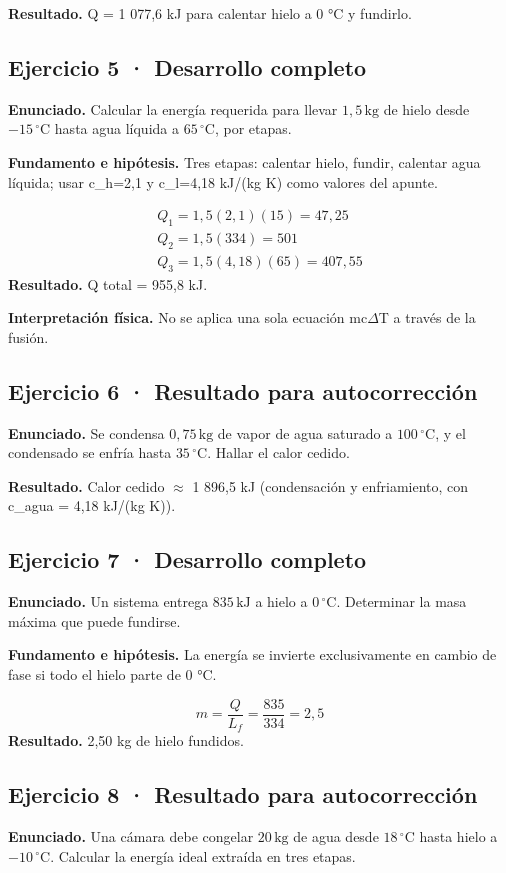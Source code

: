 \documentclass[11pt,a4paper]{article}
\begin{document}
\textbf{Resultado.} Q = 1 077,6 kJ para calentar hielo a 0 °C y fundirlo.


\subsection*{Ejercicio 5 · Desarrollo completo}
\textbf{Enunciado.} Calcular la energía requerida para llevar \(1{,}5\,\mathrm{kg}\) de hielo desde \(-15\,^\circ\mathrm C\) hasta agua líquida a \(65\,^\circ\mathrm C\), por etapas.

\textbf{Fundamento e hipótesis.} Tres etapas: calentar hielo, fundir, calentar agua líquida; usar c\_h=2,1 y c\_l=4,18 kJ/(kg K) como valores del apunte.

\[
\begin{gathered}
Q_1=1{,}5(2{,}1)(15)=47{,}25\\Q_2=1{,}5(334)=501\\Q_3=1{,}5(4{,}18)(65)=407{,}55
\end{gathered}
\]
\textbf{Resultado.} Q total = 955,8 kJ.

\textbf{Interpretación física.} No se aplica una sola ecuación mc\ensuremath{\Delta}T a través de la fusión.


\subsection*{Ejercicio 6 · Resultado para autocorrección}
\textbf{Enunciado.} Se condensa \(0{,}75\,\mathrm{kg}\) de vapor de agua saturado a \(100\,^\circ\mathrm C\), y el condensado se enfría hasta \(35\,^\circ\mathrm C\). Hallar el calor cedido.

\textbf{Resultado.} Calor cedido \ensuremath{\approx} 1 896,5 kJ (condensación y enfriamiento, con c\_agua = 4,18 kJ/(kg K)).


\subsection*{Ejercicio 7 · Desarrollo completo}
\textbf{Enunciado.} Un sistema entrega \(835\,\mathrm{kJ}\) a hielo a \(0\,^\circ\mathrm C\). Determinar la masa máxima que puede fundirse.

\textbf{Fundamento e hipótesis.} La energía se invierte exclusivamente en cambio de fase si todo el hielo parte de 0 °C.

\[
m=\frac{Q}{L_f}=\frac{835}{334}=2{,}5
\]
\textbf{Resultado.} 2,50 kg de hielo fundidos.


\subsection*{Ejercicio 8 · Resultado para autocorrección}
\textbf{Enunciado.} Una cámara debe congelar \(20\,\mathrm{kg}\) de agua desde \(18\,^\circ\mathrm C\) hasta hielo a \(-10\,^\circ\mathrm C\). Calcular la energía ideal extraída en tres etapas.
\end{document}
